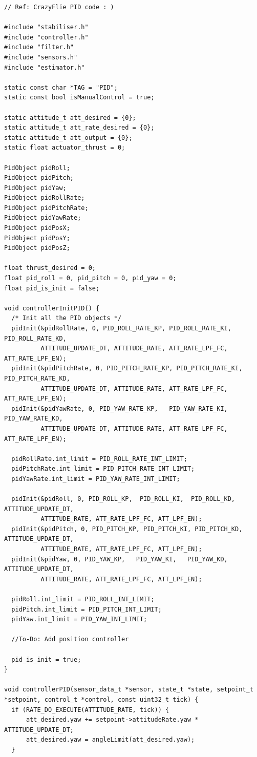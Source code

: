 \begin{lstlisting}[caption={controller.c}]
// Ref: CrazyFlie PID code : ) 

#include "stabiliser.h"
#include "controller.h"
#include "filter.h"
#include "sensors.h"
#include "estimator.h"

static const char *TAG = "PID";
static const bool isManualControl = true;

static attitude_t att_desired = {0};
static attitude_t att_rate_desired = {0};
static attitude_t att_output = {0};
static float actuator_thrust = 0;

PidObject pidRoll;
PidObject pidPitch;
PidObject pidYaw;
PidObject pidRollRate;
PidObject pidPitchRate;
PidObject pidYawRate;
PidObject pidPosX;
PidObject pidPosY;
PidObject pidPosZ;

float thrust_desired = 0; 
float pid_roll = 0, pid_pitch = 0, pid_yaw = 0; 
float pid_is_init = false; 

void controllerInitPID() {
  /* Init all the PID objects */
  pidInit(&pidRollRate, 0, PID_ROLL_RATE_KP, PID_ROLL_RATE_KI, PID_ROLL_RATE_KD,
          ATTITUDE_UPDATE_DT, ATTITUDE_RATE, ATT_RATE_LPF_FC, ATT_RATE_LPF_EN);
  pidInit(&pidPitchRate, 0, PID_PITCH_RATE_KP, PID_PITCH_RATE_KI, PID_PITCH_RATE_KD,
          ATTITUDE_UPDATE_DT, ATTITUDE_RATE, ATT_RATE_LPF_FC, ATT_RATE_LPF_EN);
  pidInit(&pidYawRate, 0, PID_YAW_RATE_KP,   PID_YAW_RATE_KI,   PID_YAW_RATE_KD,
          ATTITUDE_UPDATE_DT, ATTITUDE_RATE, ATT_RATE_LPF_FC, ATT_RATE_LPF_EN);
  
  pidRollRate.int_limit = PID_ROLL_RATE_INT_LIMIT; 
  pidPitchRate.int_limit = PID_PITCH_RATE_INT_LIMIT;
  pidYawRate.int_limit = PID_YAW_RATE_INT_LIMIT;

  pidInit(&pidRoll, 0, PID_ROLL_KP,  PID_ROLL_KI,  PID_ROLL_KD, ATTITUDE_UPDATE_DT,
          ATTITUDE_RATE, ATT_RATE_LPF_FC, ATT_LPF_EN);
  pidInit(&pidPitch, 0, PID_PITCH_KP, PID_PITCH_KI, PID_PITCH_KD, ATTITUDE_UPDATE_DT,
          ATTITUDE_RATE, ATT_RATE_LPF_FC, ATT_LPF_EN);
  pidInit(&pidYaw, 0, PID_YAW_KP,   PID_YAW_KI,   PID_YAW_KD, ATTITUDE_UPDATE_DT,
          ATTITUDE_RATE, ATT_RATE_LPF_FC, ATT_LPF_EN);

  pidRoll.int_limit = PID_ROLL_INT_LIMIT; 
  pidPitch.int_limit = PID_PITCH_INT_LIMIT;
  pidYaw.int_limit = PID_YAW_INT_LIMIT;

  //To-Do: Add position controller

  pid_is_init = true;
}

void controllerPID(sensor_data_t *sensor, state_t *state, setpoint_t *setpoint, control_t *control, const uint32_t tick) {
  if (RATE_DO_EXECUTE(ATTITUDE_RATE, tick)) {
      att_desired.yaw += setpoint->attitudeRate.yaw * ATTITUDE_UPDATE_DT;
      att_desired.yaw = angleLimit(att_desired.yaw); 
  }


\end{lstlisting}
